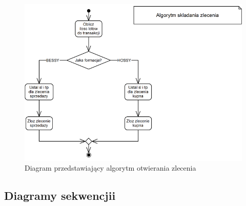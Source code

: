 \documentclass[pdflatex,11pt]{aghdpl}
\begin{document}
\begin{figure}[ht]
\begin{center}
\includegraphics[width=12cm]{otwarcie.png}
\caption{Diagram przedstawiający algorytm otwierania zlecenia}
\label{otwarcie}
\end{center}
\end{figure} 

\subsection{Diagramy sekwencjii}
\paragraph{}
\end{document}
